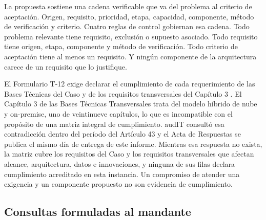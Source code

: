 La propuesta sostiene una cadena verificable que va del problema al criterio de aceptación. Origen,
requisito, prioridad, etapa, capacidad, componente, método de verificación y criterio. Cuatro
reglas de control gobiernan esa cadena. Todo problema relevante tiene requisito, exclusión o
supuesto asociado. Todo requisito tiene origen, etapa, componente y método de verificación. Todo
criterio de aceptación tiene al menos un requisito. Y ningún componente de la arquitectura carece
de un requisito que lo justifique.

El Formulario T-12 exige declarar el cumplimiento de cada requerimiento de las Bases Técnicas del
Caso y de los requisitos transversales del Capítulo 3 \parencite{bases_admin_2026}. El Capítulo 3
de las Bases Técnicas Transversales trata del modelo híbrido de nube y on-premise, uno de
veintinueve capítulos, lo que es incompatible con el propósito de una matriz integral de
cumplimiento. audIT consultó esa contradicción dentro del período del Artículo 43 y el Acta de
Respuestas se publica el mismo día de entrega de este informe. Mientras esa respuesta no exista, la
matriz cubre los requisitos del Caso y los requisitos transversales que afectan alcance,
arquitectura, datos e innovaciones, y ninguna de sus filas declara cumplimiento acreditado en esta
instancia. Un compromiso de atender una exigencia y un componente propuesto no son evidencia de
cumplimiento.

\subsection{Consultas formuladas al mandante}

